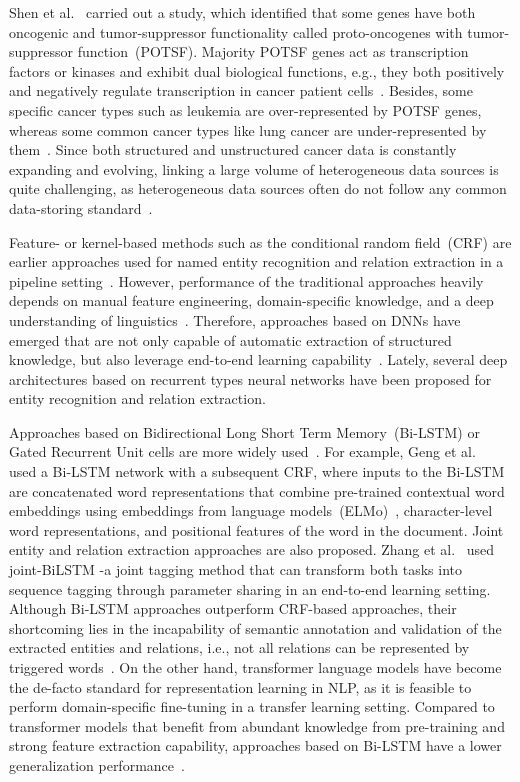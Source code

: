 \hspace*{3.5mm} Shen et al.~\cite{POSTF} carried out a study, which identified that some genes have both oncogenic and tumor-suppressor functionality called proto-oncogenes with tumor-suppressor function~(POTSF). Majority POTSF genes act as transcription factors or kinases and exhibit dual biological functions, e.g., they both positively and negatively regulate transcription in cancer patient cells~\cite{POSTF}. Besides, some specific cancer types such as leukemia are over-represented by POTSF genes, whereas some common cancer types like lung cancer are under-represented by them~\cite{POSTF}. Since both structured and unstructured cancer data is constantly expanding and evolving, linking a large volume of heterogeneous data sources is quite challenging, as heterogeneous data sources often do not follow any common data-storing standard~\cite{hasan2020knowledge}. 

\hspace*{3.5mm} Feature- or kernel-based methods such as the conditional random field~(CRF) are earlier approaches used for named entity recognition and relation extraction in a pipeline setting~\cite{xue2019fine}. However, performance of the traditional approaches heavily depends on manual feature engineering, domain-specific knowledge, and a deep understanding of linguistics~\cite{xue2019fine}. Therefore, approaches based on DNNs have emerged that are not only capable of automatic extraction of structured knowledge, but also leverage end-to-end learning capability~\cite{dogan2019fine}. Lately, several deep architectures based on recurrent types neural networks have been proposed for entity recognition and relation extraction. 


\hspace*{3.5mm} Approaches based on Bidirectional Long Short Term Memory~(Bi-LSTM) or Gated Recurrent Unit cells are more widely used~\cite{zheng2017joint}. For example, Geng et al.~\cite{zhang2020semi} used a Bi-LSTM network with a subsequent CRF, where inputs to the Bi-LSTM are concatenated word representations that combine pre-trained contextual word embeddings using embeddings from language models~(ELMo)~\cite{peters2018deep}, character-level word representations, and positional features of the word in the document. Joint entity and relation extraction approaches are also proposed. Zhang et al.~\cite{zheng2017joint} used joint-BiLSTM -a joint tagging method that can transform both tasks into sequence tagging through parameter sharing in an end-to-end learning setting. Although Bi-LSTM approaches outperform CRF-based approaches, their shortcoming lies in the incapability of semantic annotation and validation of the extracted entities and relations, i.e., not all relations can be represented by triggered words~\cite{sun2020biomedical}. 
On the other hand, transformer language models have become the de-facto standard for representation learning in NLP, as it is feasible to perform domain-specific fine-tuning in a transfer learning setting. Compared to transformer models that benefit from abundant knowledge from pre-training and strong feature extraction capability, approaches based on Bi-LSTM have a lower generalization performance~\cite{xue2019fine}. 


